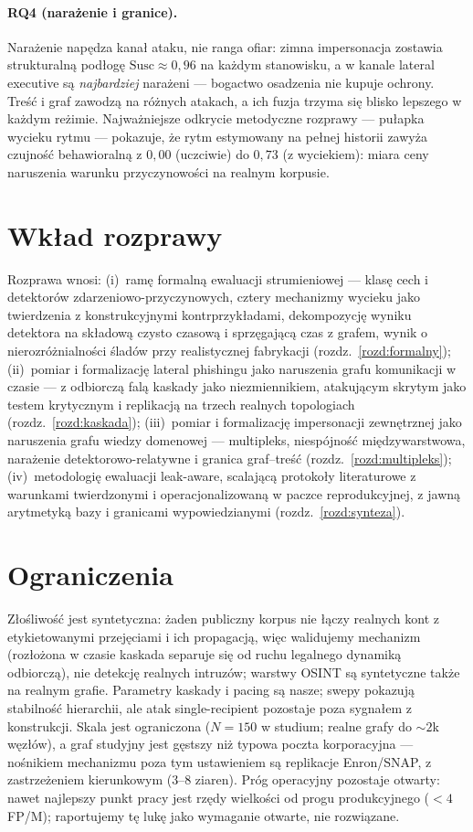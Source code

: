 \paragraph{RQ4 (narażenie i granice).} Narażenie napędza kanał
ataku, nie ranga ofiar: zimna impersonacja zostawia strukturalną
podłogę $\mathrm{Susc}\approx0{,}96$ na każdym stanowisku, a w kanale
lateral executive są \emph{najbardziej} narażeni --- bogactwo
osadzenia nie kupuje ochrony. Treść i graf zawodzą na różnych
atakach, a ich fuzja trzyma się blisko lepszego w każdym reżimie.
Najważniejsze odkrycie metodyczne rozprawy --- pułapka wycieku
rytmu --- pokazuje, że rytm estymowany na pełnej historii zawyża
czujność behawioralną z $0{,}00$ (uczciwie) do $0{,}73$ (z
wyciekiem): miara ceny naruszenia warunku przyczynowości
na realnym korpusie.

\section{Wkład rozprawy}
\label{sec:z-wklad}

Rozprawa wnosi: (i)~ramę formalną ewaluacji strumieniowej ---
klasę cech i detektorów zdarzeniowo-przyczynowych, cztery
mechanizmy wycieku jako twierdzenia z konstrukcyjnymi
kontrprzykładami, dekompozycję wyniku detektora na składową
czysto czasową i sprzęgającą czas z grafem, wynik o
nierozróżnialności śladów przy realistycznej fabrykacji
(rozdz.~\ref{rozd:formalny}); (ii)~pomiar i formalizację lateral
phishingu jako naruszenia grafu komunikacji w czasie --- z
odbiorczą falą kaskady jako niezmiennikiem, atakującym skrytym
jako testem krytycznym i replikacją na trzech realnych
topologiach (rozdz.~\ref{rozd:kaskada}); (iii)~pomiar
i formalizację impersonacji zewnętrznej jako naruszenia grafu
wiedzy domenowej --- multipleks, niespójność międzywarstwowa,
narażenie detektorowo-relatywne i granica graf--treść
(rozdz.~\ref{rozd:multipleks}); (iv)~metodologię ewaluacji
leak-aware, scalającą protokoły literaturowe z warunkami
twierdzonymi i operacjonalizowaną w paczce reprodukcyjnej, z
jawną arytmetyką bazy i granicami wypowiedzianymi
(rozdz.~\ref{rozd:synteza}).

\section{Ograniczenia}
\label{sec:z-ograniczenia}

Złośliwość jest syntetyczna: żaden publiczny korpus nie łączy
realnych kont z etykietowanymi przejęciami i ich propagacją, więc
walidujemy mechanizm (rozłożona w czasie kaskada separuje się
od ruchu legalnego dynamiką odbiorczą), nie detekcję realnych
intruzów; warstwy OSINT są syntetyczne także na realnym grafie.
Parametry kaskady i pacing są nasze; swepy pokazują stabilność
hierarchii, ale atak single-recipient pozostaje poza sygnałem
z konstrukcji. Skala jest ograniczona ($N{=}150$ w studium;
realne grafy do $\sim\!2$k węzłów), a graf studyjny jest gęstszy
niż typowa poczta korporacyjna --- nośnikiem mechanizmu poza
tym ustawieniem są replikacje Enron/SNAP, z zastrzeżeniem
kierunkowym (3--8 ziaren). Próg operacyjny pozostaje otwarty:
nawet najlepszy punkt pracy jest rzędy wielkości od progu
produkcyjnego ($<\!4$ FP/M); raportujemy tę lukę jako wymaganie
otwarte, nie rozwiązane.

